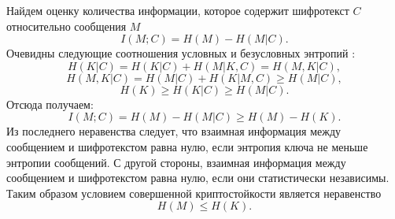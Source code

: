 Найдем оценку количества информации, которое содержит шифротекст $C$ относительно сообщения  $M$
\[ I(M; C) = H(M) - H(M | C). \]
Очевидны следующие соотношения условных и безусловных энтропий \cite{GabPil:2007}:
\[H(K|C)=H(K|C)+H(M|K,C)=H(M,K|C),\]
\[H(M,K|C)=H(M|C)+H(K|M,C)\geq H(M|C),\]
\[H(K)\geq H(K|C)\geq H(M|C).\]
Отсюда получаем:
 \[ I(M; C) = H(M) - H(M | C)\geq H(M)-H(K). \]
Из последнего неравенства следует, что взаимная информация между сообщением и шифротекстом равна нулю, если энтропия ключа не меньше энтропии сообщений. С другой стороны, взаимная информация между сообщением и шифротекстом равна нулю, если они статистически независимы. Таким образом условием совершенной криптостойкости является неравенство
\[ H(M) \leq H(K).\]





